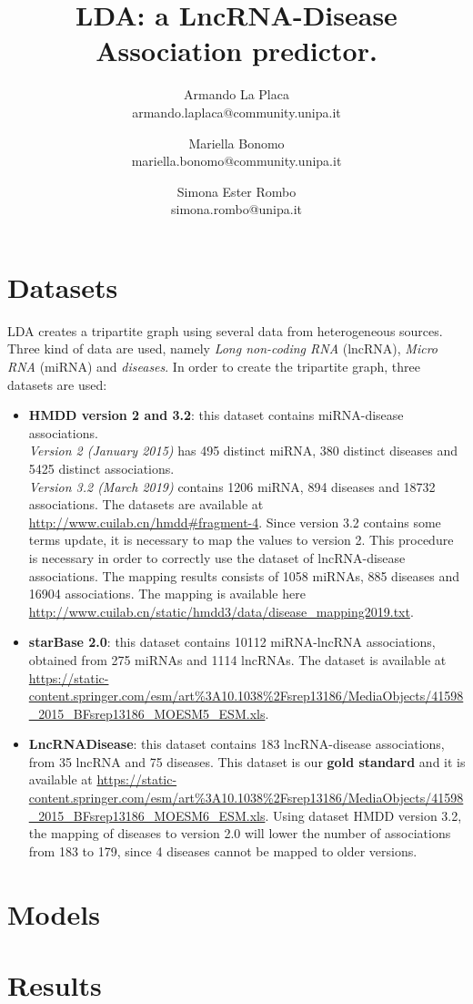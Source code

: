 \documentclass{article}
\title{LDA: a LncRNA-Disease Association predictor.}
\author{Armando La Placa\\ armando.laplaca@community.unipa.it \and Mariella Bonomo\\ mariella.bonomo@community.unipa.it \and  Simona Ester Rombo\\ simona.rombo@unipa.it}
\date{}
\begin{document}
	\maketitle
	\section{Datasets}
	LDA creates a tripartite graph using several data from heterogeneous sources. Three kind of data are used, namely \textit{Long non-coding RNA} (lncRNA), \textit{Micro RNA} (miRNA) and \textit{diseases}.  In order to create the tripartite graph, three datasets are used:
	\begin{itemize}
		\item \textbf{HMDD version 2 and 3.2}: this dataset contains miRNA-disease associations. \\\textit{Version 2 (January 2015)} has 495 distinct miRNA, 380 distinct diseases and 5425 distinct associations. \\\textit{Version 3.2 (March 2019)} contains 1206 miRNA, 894 diseases and 18732 associations. The datasets are available at \url{http://www.cuilab.cn/hmdd#fragment-4}. Since version 3.2 contains some terms update, it is necessary to map the values to version 2. This procedure is necessary in order to correctly use the dataset of lncRNA-disease associations. The mapping results consists of 1058 miRNAs, 885 diseases and 16904 associations. The mapping is available here \url{http://www.cuilab.cn/static/hmdd3/data/disease_mapping2019.txt}.
		\item \textbf{starBase 2.0}: this dataset contains 10112 miRNA-lncRNA associations, obtained from 275 miRNAs and 1114 lncRNAs. The dataset is available at \url{https://static-content.springer.com/esm/art%3A10.1038%2Fsrep13186/MediaObjects/41598_2015_BFsrep13186_MOESM5_ESM.xls}.
		\item \textbf{LncRNADisease}: this dataset contains 183 lncRNA-disease associations, from 35 lncRNA and 75 diseases. This dataset is our \textbf{gold standard} and it is available at \url{https://static-content.springer.com/esm/art%3A10.1038%2Fsrep13186/MediaObjects/41598_2015_BFsrep13186_MOESM6_ESM.xls}. Using dataset HMDD version 3.2, the mapping of diseases to version 2.0 will lower the number of associations from 183 to 179, since 4 diseases cannot be mapped to older versions.
	\end{itemize}
	\section{Models}
	\blindtext
	\section{Results}	
	\blindtext
\end{document}
